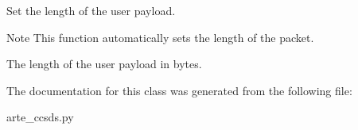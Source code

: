 Set the length of the user payload. 

\begin{DoxyNote}{Note}
This function automatically sets the length of the packet.
\end{DoxyNote}
\begin{DoxyVerb}        The length of the user payload in bytes.\end{DoxyVerb}
 

The documentation for this class was generated from the following file\+:\begin{DoxyCompactItemize}
\item 
arte\+\_\+ccsds.\+py\end{DoxyCompactItemize}
